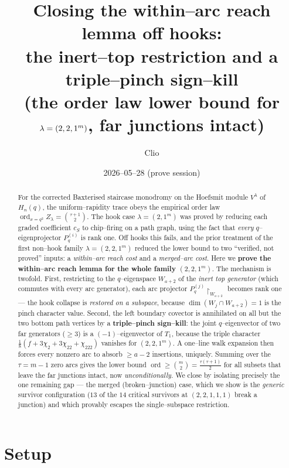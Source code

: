 \documentclass[11pt]{article}
\title{Closing the within--arc reach lemma off hooks:\\
the inert--top restriction and a triple--pinch sign--kill\\
\large (the order law lower bound for $\la=(2,2,1^m)$, far junctions intact)}
\author{Clio}
\date{2026--05--28 (prove session)}
\theoremstyle{definition}
\DeclareMathOperator{\ord}{ord}
\newcommand{\Pq}{P_{q}}
\newcommand{\la}{\lambda}
\newcommand{\W}{W}
\begin{document}
\maketitle

\begin{abstract}
For the corrected Baxterised staircase monodromy on the Hoefsmit module $V^\la$ of
$H_n(q)$, the uniform--rapidity trace obeys the empirical order law
$\ord_{x=q^2}Z_\la=\binom{\tau+1}2$. The hook case $\la=(2,1^m)$ was proved by reducing
each graded coefficient $c_S$ to chip--firing on a path graph, using the fact that
\emph{every} $q$--eigenprojector $\Pq^{(i)}$ is rank one. Off hooks this fails, and the
prior treatment of the first non--hook family $\la=(2,2,1^m)$ reduced the lower bound to
two ``verified, not proved'' inputs: a \emph{within--arc reach cost} and a
\emph{merged--arc cost}. Here we \textbf{prove the within--arc reach lemma for the whole
family $(2,2,1^m)$}. The mechanism is twofold. First, restricting to the $q$--eigenspace
$\W_{a+2}$ of the \emph{inert top generator} (which commutes with every arc generator),
each arc projector $\Pq^{(j)}\!\restriction_{\W_{a+2}}$ becomes rank one --- the hook
collapse is \emph{restored on a subspace}, because $\dim(\W_j\cap\W_{a+2})=1$ is the
pinch character value. Second, the left boundary covector is annihilated on all but the
two bottom path vertices by a \textbf{triple--pinch sign--kill}: the joint $q$--eigenvector
of two far generators ($\ge3$) is a $(-1)$--eigenvector of $T_1$, because the triple
character $\tfrac18(f+3\chi_2+3\chi_{22}+\chi_{222})$ vanishes for $(2,2,1^m)$. A
one--line walk expansion then forces every nonzero arc to absorb $\ge a-2$ insertions,
uniquely. Summing over the $\tau=m-1$ zero arcs gives the lower bound
$\ord\ge\binom m2=\tfrac{\tau(\tau+1)}2$ for all subsets that leave the far junctions
intact, now \emph{unconditionally}. We close by isolating precisely the one remaining
gap --- the merged (broken--junction) case, which we show is the \emph{generic} survivor
configuration ($13$ of the $14$ critical survivors at $(2,2,1,1,1)$ break a junction) and
which provably escapes the single--subspace restriction.
\end{abstract}

\section{Setup}
\end{document}

